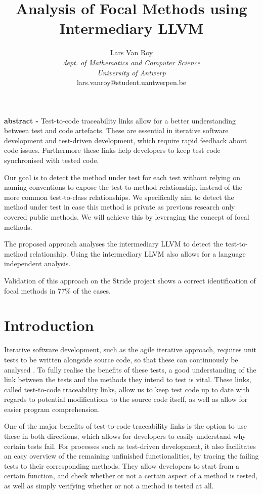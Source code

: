 \documentclass[11pt]{article}
\title{\vspace{-3cm}Analysis of Focal Methods using Intermediary LLVM}
\author{Lars Van Roy\\
\textit{dept. of Mathematics and Computer Science} \\
\textit{University of Antwerp}\\
lars.vanroy@student.uantwerpen.be}
\begin{document}
\maketitle{}

\begin{multicols}{2}

\noindent
\textbf{abstract - } Test-to-code traceability links allow for a better understanding between test and code artefacts. These are essential in iterative software development and test-driven development, which require rapid feedback about code issues. Furthermore these links help developers to keep test code synchronised with tested code.

Our goal is to detect the method under test for each test without relying on naming conventions to expose the test-to-method relationship, instead of the more common test-to-class relationships. We specifically aim to detect the method under test in case this method is private as previous research only covered public methods. We will achieve this by leveraging the concept of focal methods.

The proposed approach analyses the intermediary LLVM to detect the test-to-method relationship. Using the intermediary LLVM also allows for a language independent analysis.

Validation of this approach on the Stride project shows a correct identification of focal methods in 77\% of the cases.

\section{Introduction}
Iterative software development, such as the agile iterative approach, requires unit tests to be written alongside source code, so that these can continuously be analysed \cite{6298092}. To fully realise the benefits of these tests, a good understanding of the link between the tests and the methods they intend to test is vital. These links, called test-to-code traceability links, allow us to keep test code up to date with regards to potential modifications to the source code itself, as well as allow for easier program comprehension.

One of the major benefits of test-to-code traceability links is the option to use these in both directions, which allows for developers to easily understand why certain tests fail. \cite{6716450} For processes such as test-driven development, it also facilitates an easy overview of the remaining unfinished functionalities, by tracing the failing tests to their corresponding methods. They allow developers to start from a certain function, and check whether or not a certain aspect of a method is tested, as well as simply verifying whether or not a method is tested at all. \cite{hayes2009towards}


\end{multicols}
\end{document}
